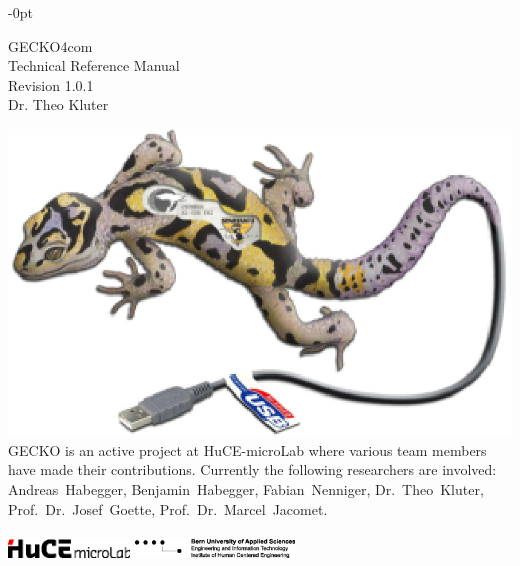 \begin{adjustwidth}{-\skipleft}{0pt}
\begin{center}
\huge{{\sc GECKO4com}}\\
\large{Technical Reference Manual}\\
\large{Revision 1.0.1}\\
Dr. Theo Kluter
\end{center}
\vspace*{2cm}%
\includegraphics[width=\columnwidth]{figs/gecko3logo}%
\vspace*{2cm}\\%
{\sc GECKO} is an active project at HuCE-microLab where various team members
have made their contributions. Currently the following researchers are
involved:\\
Andreas~Habegger, %
Benjamin~Habegger, %
Fabian~Nenniger, %
Dr.~Theo~Kluter, \\
Prof.~Dr.~Josef~Goette, %
Prof.~Dr.~Marcel~Jacomet.\\
 \\
\includegraphics[height=0.5cm]{figs/HuCEmicrolab-nofont}\hspace*{4.5cm}%
\includegraphics[height=0.5cm]{figs/BFHhuceENnofonts}\\
\end{adjustwidth}
